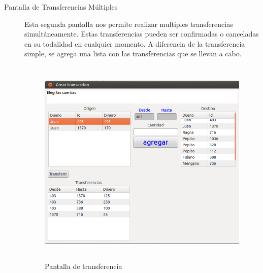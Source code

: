 \begin{description}
		
	\item[Pantalla de Transferencias Múltiples]
		Esta segunda pantalla nos permite realizar multiples transferencias
		simultáneamente.
		Estas transferencias pueden ser confirmadas o canceladas en su todalidad en
		cualquier momento.
		A diferencia de la transferencia simple, se agrega una
		lista con las transferencias que se llevan a cabo.
	
		\begin{figure}[h]
			\centering
			\includegraphics[width=450px, height=380px]{img/multTransferencias}
			\caption{Pantalla de transferencia}
			\label{trasferenciaMultiple}
		\end{figure}
		
\end{description}
